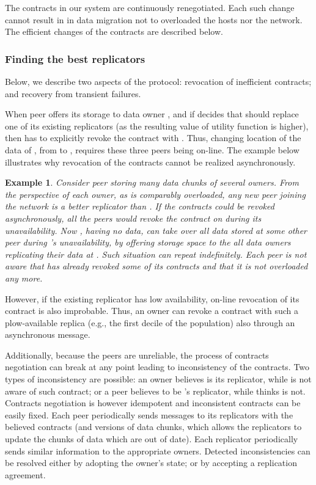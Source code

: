 \documentclass[10pt, final, conference, letterpaper]{IEEEtran}
\newtheorem{example}{Example}
\begin{document}
The contracts in our system are continuously renegotiated. Each such change cannot result in in data migration not to overloaded the hosts nor the network. The efficient changes of the contracts are described below.

\subsubsection{Finding the best replicators}

Below, we describe two aspects of the protocol: revocation of inefficient contracts; and recovery from transient failures.

When peer  offers its storage to data owner , and if  decides that  should replace one of its existing replicators  (as the resulting value of utility function  is higher), then  has to explicitly revoke the contract with . Thus, changing location of the data of , from  to , requires these three peers being on-line. The example below illustrates why revocation of the contracts cannot be realized asynchronously. 

\begin{example}
Consider peer  storing many data chunks of several owners. From the perspective of each owner, as  is comparably overloaded, any new peer joining the network is a better replicator than . If the contracts could be revoked asynchronously, all the peers would revoke the contract on  during its unavailability. Now , having no data, can take over all data stored at some other peer  during 's unavailability, by offering storage space to the all data owners replicating their data at . Such situation can repeat indefinitely. Each peer is not aware that  has already revoked some of its contracts and that it is not overloaded any more.
\end{example}

However, if the existing replicator  has low availability, on-line revocation of its contract is also improbable. Thus, an owner can revoke a contract with such a plow-available replica (e.g., the first decile of the population) also through an asynchronous message.

Additionally, because the peers are unreliable, the process of contracts negotiation can break at any point leading to inconsistency of the contracts. Two types of inconsistency are possible: an owner  believes  is its replicator, while  is not aware of such contract; or a peer  believes to be 's replicator, while  thinks  is not. Contracts negotiation is however idempotent and inconsistent contracts can be easily fixed. Each peer periodically sends messages to its replicators with the believed contracts (and versions of data chunks, which allows the replicators to update the chunks of data which are out of date). Each replicator periodically sends similar information to the appropriate owners. Detected inconsistencies can be resolved either by adopting the owner's state; or by accepting a replication agreement.
\end{document}
